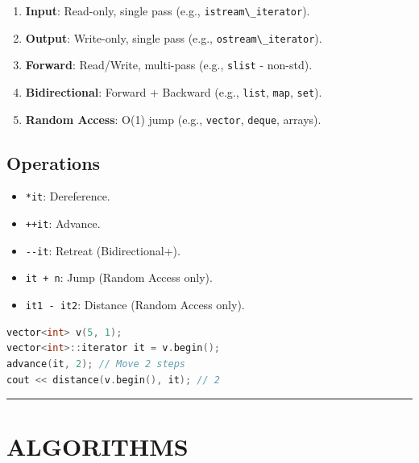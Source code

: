 \begin{enumerate}
\def\labelenumi{\arabic{enumi}.}
\tightlist
\item
  \textbf{Input}: Read-only, single pass (e.g.,
  \passthrough{\lstinline!istream\_iterator!}).
\item
  \textbf{Output}: Write-only, single pass (e.g.,
  \passthrough{\lstinline!ostream\_iterator!}).
\item
  \textbf{Forward}: Read/Write, multi-pass (e.g.,
  \passthrough{\lstinline!slist!} - non-std).
\item
  \textbf{Bidirectional}: Forward + Backward (e.g.,
  \passthrough{\lstinline!list!}, \passthrough{\lstinline!map!},
  \passthrough{\lstinline!set!}).
\item
  \textbf{Random Access}: O(1) jump (e.g.,
  \passthrough{\lstinline!vector!}, \passthrough{\lstinline!deque!},
  arrays).
\end{enumerate}

\hypertarget{operations}{%
\subsection{Operations}\label{operations}}

\begin{itemize}
\tightlist
\item
  \passthrough{\lstinline!*it!}: Dereference.
\item
  \passthrough{\lstinline!++it!}: Advance.
\item
  \passthrough{\lstinline!--it!}: Retreat (Bidirectional+).
\item
  \passthrough{\lstinline!it + n!}: Jump (Random Access only).
\item
  \passthrough{\lstinline!it1 - it2!}: Distance (Random Access only).
\end{itemize}

\begin{lstlisting}[language={C++}]
vector<int> v(5, 1); 
vector<int>::iterator it = v.begin();
advance(it, 2); // Move 2 steps
cout << distance(v.begin(), it); // 2
\end{lstlisting}

\begin{center}\rule{0.5\linewidth}{0.5pt}\end{center}

\hypertarget{algorithms}{%
\section{ALGORITHMS}\label{algorithms}}

